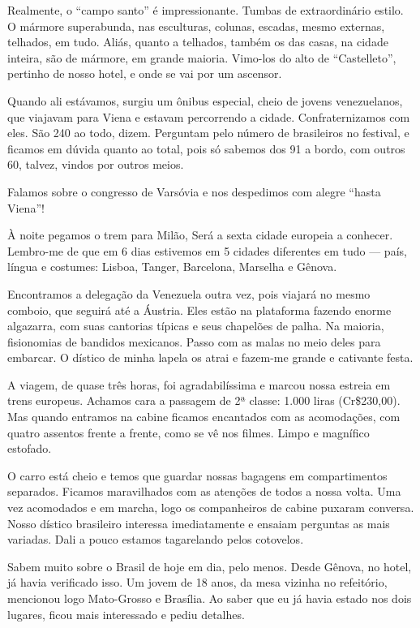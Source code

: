 Realmente, o ``campo santo'' é impressionante. Tumbas de extraordinário estilo. O mármore superabunda, nas esculturas, colunas, escadas, mesmo externas, telhados, em tudo. Aliás, quanto a telhados, também os das casas, na cidade inteira, são de mármore, em grande maioria. Vimo-los do alto de ``Castelleto'', pertinho de nosso hotel, e onde se vai por um ascensor.

Quando ali estávamos, surgiu um ônibus especial, cheio de jovens venezuelanos, que viajavam para Viena e estavam percorrendo a cidade. Confraternizamos com eles. São 240 ao todo, dizem. Perguntam pelo número de brasileiros no festival, e ficamos em dúvida quanto ao total, pois só sabemos dos 91 a bordo, com outros 60, talvez, vindos por outros meios.

Falamos sobre o congresso de Varsóvia e nos despedimos com alegre ``hasta Viena''!

À noite pegamos o trem para Milão, Será a sexta cidade europeia a conhecer. Lembro-me de que em 6 dias estivemos em 5 cidades diferentes em tudo --- país, língua e costumes: Lisboa, Tanger, Barcelona, Marselha e Gênova.

Encontramos a delegação da Venezuela outra vez, pois viajará no mesmo comboio, que seguirá até a Áustria. Eles estão na plataforma fazendo enorme algazarra, com suas cantorias típicas e seus chapelões de palha. Na maioria, fisionomias de bandidos mexicanos. Passo com as malas no meio deles para embarcar. O dístico de minha lapela os atrai e fazem-me grande e cativante festa.

A viagem, de quase três horas, foi agradabilíssima e marcou nossa estreia em trens europeus. Achamos cara a passagem de 2ª classe: 1.000 liras (Cr\$230,00). Mas quando entramos na cabine ficamos encantados com as acomodações, com quatro assentos frente a frente, como se vê nos filmes. Limpo e magnífico estofado.

O carro está cheio e temos que guardar nossas bagagens em compartimentos separados. Ficamos maravilhados com as atenções de todos a nossa volta. Uma vez acomodados e em marcha, logo os companheiros de cabine puxaram conversa. Nosso dístico brasileiro interessa imediatamente e ensaiam perguntas as mais variadas. Dali a pouco estamos tagarelando pelos cotovelos.

Sabem muito sobre o Brasil de hoje em dia, pelo menos. Desde Gênova, no hotel, já havia verificado isso. Um jovem de 18 anos, da mesa vizinha no refeitório, mencionou logo Mato-Grosso e Brasília. Ao saber que eu já havia estado nos dois lugares, ficou mais interessado e pediu detalhes.

